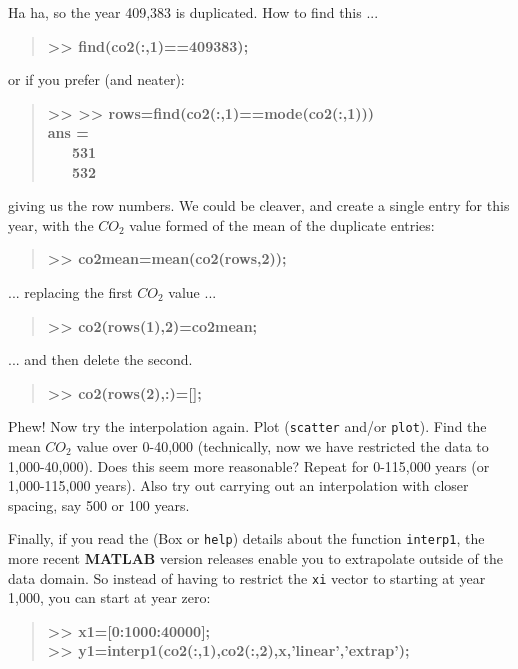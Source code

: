 \documentclass{tufte-book} %
\newenvironment{docspecbold}{\begin{quotation}\ttfamily\bfseries\parskip0pt\parindent0pt\ignorespaces}{\end{quotation}}
\begin{document}
Ha ha, so the year 409,383 is duplicated. How to find this ...
\begin{docspecbold}
>> find(co2(:,1)==409383);
\end{docspecbold}

\noindent or if you prefer (and neater):
\begin{docspecbold}
>> >> rows=find(co2(:,1)==mode(co2(:,1)))\\
ans =\\
\ \ \ 531\\
\ \ \ 532\\
\end{docspecbold}

\noindent giving us the row numbers. We could be cleaver, and create a single entry for this year, with the \(CO_{2}\) value formed of the mean of the duplicate entries:
\begin{docspecbold}
>> co2mean=mean(co2(rows,2));
\end{docspecbold}
\noindent ... replacing the first \(CO_{2}\) value ...
\begin{docspecbold}
>> co2(rows(1),2)=co2mean;
\end{docspecbold}
\noindent ... and then delete the second.
\begin{docspecbold}
>> co2(rows(2),:)=[];
\end{docspecbold}

Phew! Now try the interpolation again. Plot (\texttt{scatter} and/or \texttt{plot}). Find the mean \(CO_{2}\) value over 0-40,000 (technically, now we have restricted the data to 1,000-40,000). Does this seem more reasonable? Repeat for 0-115,000 years (or 1,000-115,000 years). Also try out carrying out an interpolation with closer spacing, say 500 or 100 years.

Finally, if you read the (Box or \texttt{help}) details about the function \texttt{interp1}, the more recent \textbf{MATLAB} version releases enable you to extrapolate outside of the data domain. So instead of having to restrict the \texttt{xi} vector to starting at year 1,000, you can start at year zero:
\begin{docspecbold}
>> x1=[0:1000:40000];\\
>> y1=interp1(co2(:,1),co2(:,2),x,'linear','extrap'); 
\end{docspecbold}
\end{document}
